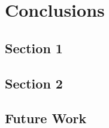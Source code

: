 %
\chapter{Conclusions}
\label{sec:conclusions}


\section{Section 1}
\label{sec:conclusions:sec1}



\section{Section 2}
\label{sec:conclusions:sec2}



\section{Future Work}
\label{sec:conclusions:future}

